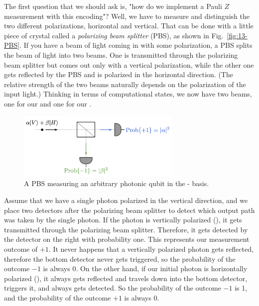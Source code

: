
The first question that we should ask is, "how do we implement a Pauli $Z$ measurement with this encoding"? Well, we have to measure and distinguish the two different polarizations, horizontal and vertical. That can be done with a little piece of crystal called a \emph{polarizing beam splitter} (PBS), as shown in Fig.~\ref{fig:13-PBS}. If you have a beam of light coming in with some polarization, a PBS splits the beam of light into two beams. One is transmitted through the polarizing beam splitter but comes out only with a vertical polarization, while the other one gets reflected by the PBS and is polarized in the horizontal direction. (The relative strength of the two beams naturally depends on the polarization of the input light.) Thinking in terms of computational states, we now have two beams, one for our  and one for our .  

\begin{figure}[t]
    \centering
    \includegraphics[width=0.7\textwidth]{lesson13/PBS-measure.png}
    \caption[A polarizing beam splitter (PBS) measuring a qubit]{A PBS measuring an arbitrary photonic qubit in the - basis.}
    \label{fig:13-PBS-measure}
\end{figure}

Assume that we have a single photon polarized in the vertical direction, and we place two detectors after the polarizing beam splitter to detect which output path was taken by the single photon. If the photon is vertically polarized (), it gets transmitted through the polarizing beam splitter. Therefore, it gets detected by the detector on the right with probability one. This represents our measurement outcome of $+1$. It never happens that a vertically polarized photon gets reflected, therefore the bottom detector never gets triggered, so the probability of the outcome $-1$ is always 0. On the other hand, if our initial photon is horizontally polarized (), it always gets reflected and travels down into the bottom detector, triggers it, and always gets detected. So the probability of the outcome $-1$ is 1, and the probability of the outcome $+1$ is always 0.

